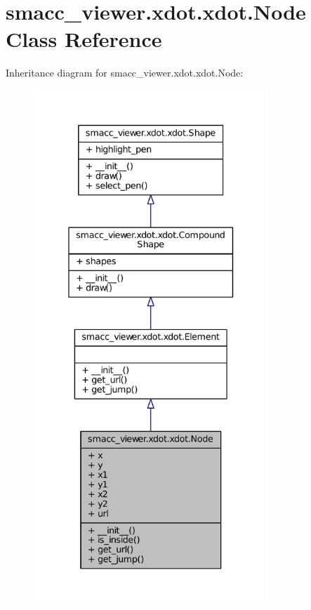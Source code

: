 \hypertarget{classsmacc__viewer_1_1xdot_1_1xdot_1_1Node}{}\section{smacc\+\_\+viewer.\+xdot.\+xdot.\+Node Class Reference}
\label{classsmacc__viewer_1_1xdot_1_1xdot_1_1Node}


Inheritance diagram for smacc\+\_\+viewer.\+xdot.\+xdot.\+Node\+:
\nopagebreak
\begin{figure}[H]
\begin{center}
\leavevmode
\includegraphics[height=550pt]{classsmacc__viewer_1_1xdot_1_1xdot_1_1Node__inherit__graph}
\end{center}
\end{figure}


